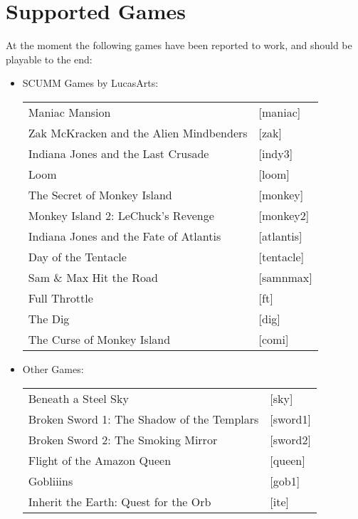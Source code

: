 \section{Supported Games}

At the moment the following games have been reported to work, and should
be playable to the end:

\begin{itemize}
\item SCUMM Games by LucasArts:\\
  \begin {tabular} [h] {ll}
    Maniac Mansion&                                [maniac]\\
    Zak McKracken and the Alien Mindbenders&       [zak]\\
    Indiana Jones and the Last Crusade&            [indy3]\\
    Loom&                                          [loom]\\
    The Secret of Monkey Island&                   [monkey]\\
    Monkey Island 2: LeChuck's Revenge&            [monkey2]\\
    Indiana Jones and the Fate of Atlantis&        [atlantis]\\
    Day of the Tentacle&                           [tentacle]\\
    Sam \& Max Hit the Road&                       [samnmax]\\
    Full Throttle&                                 [ft]\\
    The Dig&                                       [dig]\\
    The Curse of Monkey Island&                    [comi]\\
  \end{tabular}
\item Other Games:\\ 
  \begin{tabular}[h]{ll}
    Beneath a Steel Sky&                           [sky]\\
    Broken Sword 1: The Shadow of the Templars&    [sword1]\\
    Broken Sword 2: The Smoking Mirror&            [sword2]\\
    Flight of the Amazon Queen&                    [queen]\\
    Gobliiins&                                     [gob1]\\
    Inherit the Earth: Quest for the Orb&          [ite]\\

\end{tabular}
\end{itemize}
